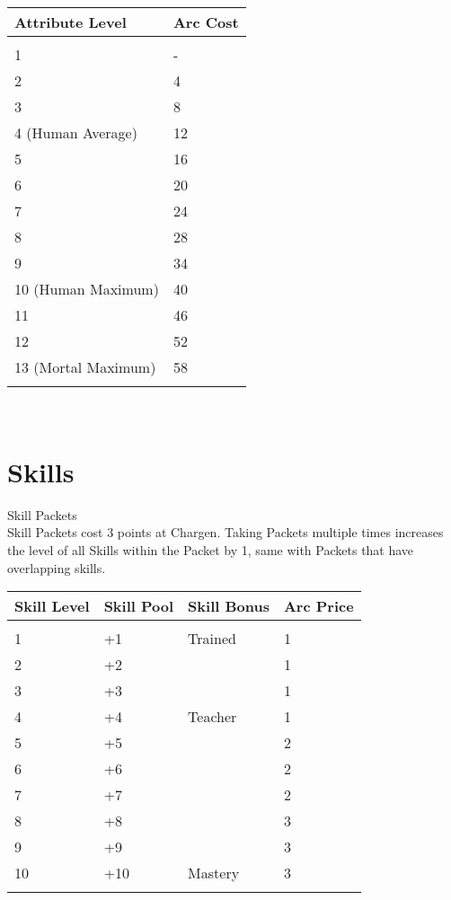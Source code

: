 \documentclass[a4paper, twocolumn, openany]{book}
\begin{document}
{{\centering
	\begin{tabular}{ll}
		Attribute Level & Arc Cost \\ \hline \\
		1					& - \\
		2					& 4 \\
		3					& 8 \\
		4 (Human Average)	& 12 \\
		5					& 16 \\
		6					& 20 \\
		7					& 24 \\
		8					& 28 \\
		9					& 34 \\
		10 (Human Maximum)	& 40 \\
		11					& 46 \\
		12 					& 52 \\
		13 (Mortal Maximum) & 58 \\
		\\ \hline
	\end{tabular}\\[\baselineskip] } %

\section{Skills}

{\large Skill Packets\\}
Skill Packets cost 3 points at Chargen. Taking Packets multiple times increases the level of all
Skills within the Packet by 1, same with Packets that have overlapping skills.\\

{\centering
\begin{tabular}{llll}
	Skill Level & Skill Pool & Skill Bonus & Arc Price \\ \hline \\
	1  & +1  & Trained 	& 1\\
	2  & +2  & 			& 1\\
	3  & +3  & 			& 1\\
	4  & +4  & Teacher 	& 1\\
	5  & +5  & 			& 2\\
	6  & +6  & 			& 2\\
	7  & +7  & 			& 2\\
	8  & +8  & 			& 3\\
	9  & +9  & 			& 3\\
	10 & +10 & Mastery 	& 3\\
	\\ \hline
\end{tabular}\\[2\baselineskip] } %

}
\end{document}
